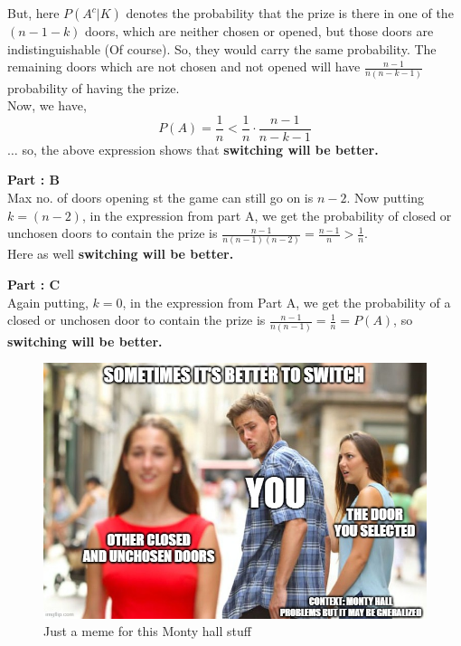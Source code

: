 \documentclass{article}
\theoremstyle{definition}
\begin{document}
But, here $P(A^c|K)$ denotes the probability that the prize is there in one of the $(n-1-k)$ doors, which are neither chosen  or opened, but those doors are indistinguishable (Of course). So, they would carry the same probability. The remaining doors which are not chosen and not opened will have $\frac{n-1}{n(n-k-1)}$ probability of having the prize. \\
Now, we have,
\[
P(A) = \frac{1}{n} < \frac{1}{n} \cdot \frac{n-1}{n-k-1}
\]
$\dots$ so, the above expression shows that \textbf{switching will be better.}

\textbf{Part : B}\\

Max no. of doors opening st the game can still go on is $n-2$.
Now putting $k=(n-2)$, in the expression from part A, we get the probability of closed or unchosen doors to contain the prize is $\frac{n-1}{n(n-1)(n-2)} = \frac{n-1}{n} > \frac{1}{n}$. \\
Here as well \textbf{switching will be better.}

\textbf{Part : C}\\
Again putting, $k=0$, in the expression from Part A, we get the probability of a closed or unchosen door to contain the prize is $\frac{n-1}{n(n-1)}=\frac{1}{n} = P(A)$, so \textbf{switching will be better.}
\begin{figure}[h]
    \centering
    \includegraphics[scale = 0.27]{memem.png}
    \caption{Just a meme for this Monty hall stuff}
    \label{fig:enter-label}
\end{figure}
\end{document}
